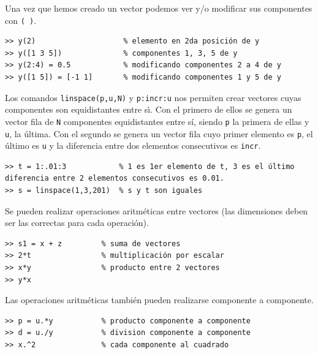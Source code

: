 \documentclass[letter,11pt]{article}
\newcommand\0{\mathbf{0}}
\begin{document}
	\medskip
	
	Una vez que hemos creado un vector podemos ver y/o modificar sus componentes
	con \Verb+( )+.
	
    \medskip

\begin{lstlisting}												
>> y(2)                    % elemento en 2da posición de y
>> y([1 3 5])              % componentes 1, 3, 5 de y
>> y(2:4) = 0.5            % modificando componentes 2 a 4 de y			
>> y([1 5]) = [-1 1]       % modificando componentes 1 y 5 de y
\end{lstlisting}

\medskip
	
	Los comandos \Verb+linspace(p,u,N)+ y \Verb+p:incr:u+ nos
	permiten crear vectores cuyas componentes son equidistantes entre s\'{\i}.
	Con el primero de ellos se genera un vector fila
	de \Verb+N+ componentes equidistantes entre s\'{i}, siendo \Verb+p+
	la primera de ellas y \Verb+u+, la \'ultima.
	Con el segundo se genera un vector fila cuyo primer elemento es \Verb+p+,
	el \'ultimo es \Verb+u+ y la diferencia entre dos elementos
	consecutivos es \Verb+incr+.
	
    \medskip

\begin{lstlisting}			
>> t = 1:.01:3            % 1 es 1er elemento de t, 3 es el último diferencia entre 2 elementos consecutivos es 0.01.
>> s = linspace(1,3,201)  % s y t son iguales
\end{lstlisting}

\medskip

	Se pueden realizar operaciones aritm\'eticas entre vectores (las
	dimensiones deben ser las co\-rrec\-tas para cada operaci\'on).
	
	\medskip

\begin{lstlisting}
>> s1 = x + z         % suma de vectores
>> 2*t                % multiplicación por escalar
>> x*y                % producto entre 2 vectores						
>> y*x
\end{lstlisting}
\medskip

	Las operaciones aritm\'eticas tambi\'en pueden realizarse componente
	a componente.

\medskip

\begin{lstlisting}				
>> p = u.*y           % producto componente a componente
>> d = u./y           % division componente a componente
>> x.^2               % cada componente al cuadrado
\end{lstlisting}
\end{document}
